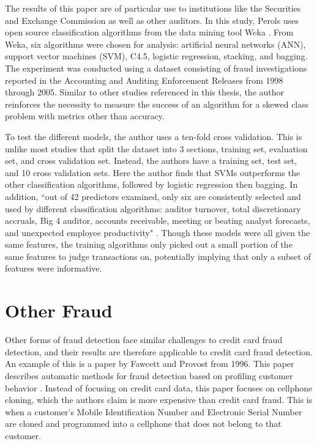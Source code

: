 \documentclass[midd]{thesis}
\begin{document}
The results of this paper are of particular use to institutions like the Securities and Exchange Commission as well as other auditors. In this study, Perols uses open source classification algorithms from the data mining tool Weka \cite{Perols2011}. From Weka, six algorithms were chosen for analysis: artificial neural networks (ANN), support vector machines (SVM), C4.5, logistic regression, stacking, and bagging. The experiment was conducted using a dataset consisting of fraud investigations reported in the Accounting and Auditing Enforcement Releases from 1998 through 2005. Similar to other studies referenced in this thesis, the author reinforces the necessity to measure the success of an algorithm for a skewed class problem with metrics other than accuracy. 

To test the different models, the author uses a ten-fold cross validation. This is unlike most studies that split the dataset into 3 sections, training set, evaluation set, and cross validation set. Instead, the authors have a training set, test set, and 10 cross validation sets. Here the author finds that SVMs outperforms the other classification algorithms, followed by logistic regression then bagging. In addition, ``out of 42 predictors examined, only six are consistently selected and used by different classification algorithms: auditor turnover, total discretionary accruals, Big 4 auditor, accounts receivable, meeting or beating analyst forecasts, and unexpected employee productivity" \cite{Perols2011}. Though these models were all given the same features, the training algorithms only picked out a small portion of the same features to judge transactions on, potentially implying that only a subset of features were informative. 

\section{Other Fraud}

Other forms of fraud detection face similar challenges to credit card fraud detection, and their results are therefore applicable to credit card fraud detection. An example of this is a paper by Fawcett and Provost from 1996. This paper describes automatic methods for fraud detection based on profiling customer behavior \cite{Fawcett1996}. Instead of focusing on credit card data, this paper focuses on cellphone cloning, which the authors claim is more expensive than credit card fraud. This is when a customer's Mobile Identification Number and Electronic Serial Number are cloned and programmed into a cellphone that does not belong to that customer. 
\end{document}
